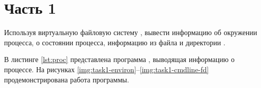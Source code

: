 \documentclass[a4paper,oneside,12pt]{extreport}
\begin{document}


\section*{Часть 1}

\begin{task*}
	Используя виртуальную файловую систему , вывести информацию об окружении процесса, о состоянии процесса, информацию из файла  и директории .
\end{task*}

В листинге \ref{lst:proc} представлена программа , выводящая информацию о процессе.
На рисунках \ref{img:task1-environ}–\ref{img:task1-cmdline-fd} продемонстрирована работа программы.


\end{document}
